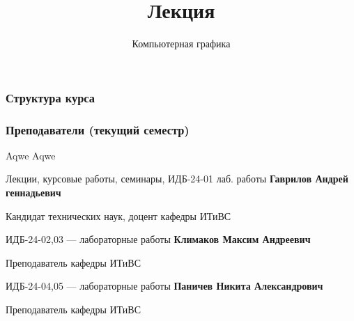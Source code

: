 \documentclass[10pt]{beamer}
\title{Лекция \lecdni \\ \lecturename}
\subtitle{Компьютерная графика}
\begin{document}
	 
	 	
	
\QRFRAME
	
\frame{\maketitle}
	
\begin{frame}[t]
	\frametitle{Структура курса}
	
	
	
		
\end{frame}

\begin{frame}\frametitle{Преподаватели (текущий семестр)}
	Aqwe {\ttfamily Aqwe}
	
\begin{alertblock}{Лекции, курсовые работы, семинары, ИДБ-24-01 лаб. работы}
	\textbf{Гаврилов Андрей геннадьевич}	
	
	Кандидат технических наук, доцент кафедры ИТиВС
\end{alertblock}	

	
\begin{block}{ИДБ-24-02,03 --- лабораторные работы}
	\textbf{Климаков Максим Андреевич}	
	
	Преподаватель кафедры ИТиВС
\end{block}

\begin{block}{ИДБ-24-04,05 --- лабораторные работы}
	\textbf{Паничев Никита Александрович}	
	
	Преподаватель кафедры ИТиВС
\end{block}
	
	
\end{frame}
\end{document}
